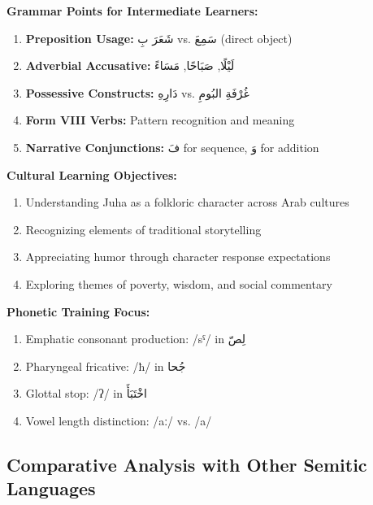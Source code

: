 \documentclass[letterpaper,12pt]{article}
\begin{document}
\begin{tcolorbox}[colback=white,colframe=headercolor,title=\textbf{Teaching Applications},breakable]
\textbf{Grammar Points for Intermediate Learners:}
\begin{enumerate}
\item \textbf{Preposition Usage:} \textarabic{شَعَرَ بِ} vs. \textarabic{سَمِعَ} (direct object)
\item \textbf{Adverbial Accusative:} \textarabic{لَيْلًا}, \textarabic{صَبَاحًا}, \textarabic{مَسَاءً}
\item \textbf{Possessive Constructs:} \textarabic{دَارِهِ} vs. \textarabic{غُرْفَةِ البُومِ}
\item \textbf{Form VIII Verbs:} Pattern recognition and meaning
\item \textbf{Narrative Conjunctions:} \textarabic{فَ} for sequence, \textarabic{وَ} for addition
\end{enumerate}

\textbf{Cultural Learning Objectives:}
\begin{enumerate}
\item Understanding Juha as a folkloric character across Arab cultures
\item Recognizing elements of traditional storytelling
\item Appreciating humor through character response expectations
\item Exploring themes of poverty, wisdom, and social commentary
\end{enumerate}

\textbf{Phonetic Training Focus:}
\begin{enumerate}
\item Emphatic consonant production: /sˤ/ in \textarabic{لِصّ}
\item Pharyngeal fricative: /ħ/ in \textarabic{جُحا}
\item Glottal stop: /ʔ/ in \textarabic{اخْتَبَأَ}
\item Vowel length distinction: /aː/ vs. /a/
\end{enumerate}
\end{tcolorbox}

\subsection{Comparative Analysis with Other Semitic Languages}
\end{document}

